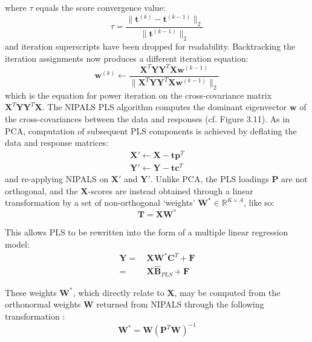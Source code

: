\begin{doublespace}
where $\tau$ equals the score convergence value:
\begin{equation}
\tau = \frac{\| \mathbf{t}^{(k)} - \mathbf{t}^{(k-1)} \|_2}
            {\| \mathbf{t}^{(k-1)} \|_2}
\end{equation}
and iteration superscripts have been dropped for readability. Backtracking the
iteration assignments now produces a different iteration equation:
\begin{equation}
\mathbf{w}^{(k)} \gets \frac{
    \mathbf{X}^T \mathbf{Y} \mathbf{Y}^T \mathbf{X} \mathbf{w}^{(k-1)}
}{
 \| \mathbf{X}^T \mathbf{Y} \mathbf{Y}^T \mathbf{X} \mathbf{w}^{(k-1)} \|_2
}
\end{equation}
which is the equation for power iteration on the cross-covariance matrix
$\mathbf{X}^T \mathbf{Y} \mathbf{Y}^T \mathbf{X}$. The NIPALS PLS algorithm
computes the dominant eigenvector $\mathbf{w}$ of the cross-covariances between
the data and responses (cf. Figure 3.11). As in PCA, computation of subsequent
PLS components is achieved by deflating the data and response matrices:
\begin{align}
\mathbf{X}' \gets \mathbf{X} - \mathbf{t} \mathbf{p}^T \\
\mathbf{Y}' \gets \mathbf{Y} - \mathbf{t} \mathbf{c}^T
\end{align}
and re-applying NIPALS on $\mathbf{X}'$ and $\mathbf{Y}'$. Unlike PCA, the PLS
loadings $\mathbf{P}$ are not orthogonal, and the $\mathbf{X}$-scores are
instead obtained through a linear transformation by a set of non-orthogonal
`weights' $\mathbf{W}^\ast \in \mathbb{R}^{K \times A}$, like so:
\begin{equation}
\mathbf{T} = \mathbf{X} \mathbf{W}^\ast
\end{equation}

This allows PLS to be rewritten into the form of a multiple linear regression
model:
\begin{align}
\mathbf{Y} =& \: \mathbf{X} \mathbf{W}^\ast \mathbf{C}^T + \mathbf{F} \\
           =& \: \mathbf{X} \hat{\mathbf{B}}_{PLS} + \mathbf{F} \nonumber
\end{align}

These weights $\mathbf{W}^\ast$, which directly relate to $\mathbf{X}$, may be
computed from the orthonormal weights $\mathbf{W}$ returned from NIPALS through
the following transformation \cite{manne:cils1987}:
\begin{equation}
\mathbf{W}^\ast = \mathbf{W} (\mathbf{P}^T \mathbf{W})^{-1}
\end{equation}
\end{doublespace}

